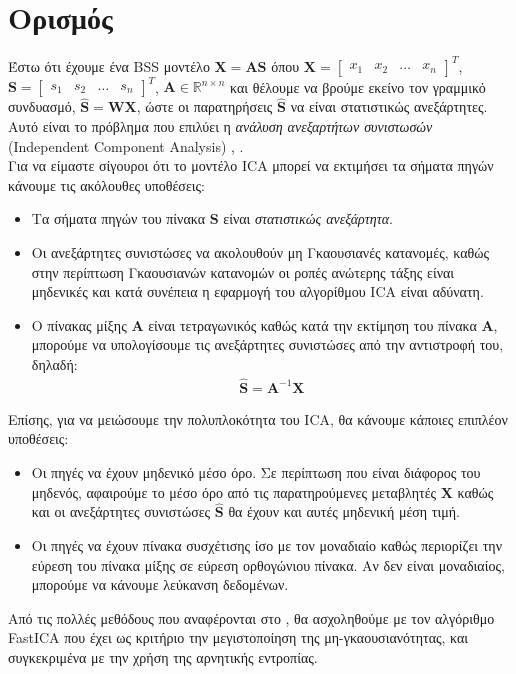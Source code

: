 \gr 
\justifying
\section{Ορισμός} \label{sec:3.1}
Έστω ότι έχουμε ένα \en BSS \gr μοντέλο \en $\mathbf{X} = \mathbf{A} \mathbf{S}$ \gr όπου \en $\mathbf{X} = \begin{bmatrix}x_1 & x_2 & \ldots & x_n \end{bmatrix}^T$, $\mathbf{S} = \begin{bmatrix} s_1 & s_2 & \ldots & s_n \end{bmatrix}^T$, $\mathbf{A} \in \mathbb{R}^{n \times n}$ \gr και θέλουμε να βρούμε εκείνο τον γραμμικό συνδυασμό, \en $\mathbf{\hat{S}} = \mathbf{W} \mathbf{X}$, \gr ώστε οι παρατηρήσεις \en $\mathbf{\hat{S}}$ \gr να είναι στατιστικώς ανεξάρτητες. Αυτό είναι το πρόβλημα που επιλύει η \emph{ανάλυση ανεξαρτήτων συνιστωσών} \en (Independent Component Analysis) \cite{ica:6}, \cite{ica:7}.
\\ 
\gr Για να είμαστε σίγουροι ότι το μοντέλο \en ICA \gr μπορεί να εκτιμήσει τα σήματα πηγών κάνουμε τις ακόλουθες υποθέσεις:
\begin{itemize}
    \item Τα σήματα πηγών του πίνακα \en $\mathbf{S}$ \gr είναι \emph{στατιστικώς ανεξάρτητα}.
    \item Οι ανεξάρτητες συνιστώσες να ακολουθούν μη Γκαουσιανές κατανομές, καθώς στην περίπτωση Γκαουσιανών κατανομών οι ροπές ανώτερης τάξης είναι μηδενικές και κατά συνέπεια η εφαρμογή του αλγορίθμου \en ICA \gr είναι αδύνατη.
    \item Ο πίνακας μίξης \en $\mathbf{A}$ \gr είναι τετραγωνικός καθώς κατά την εκτίμηση του πίνακα \en $\mathbf{A}$, \gr μπορούμε να υπολογίσουμε τις ανεξάρτητες συνιστώσες από την αντιστροφή του, δηλαδή: \en
    \begin{align*}
        \mathbf{\hat{S}} = \mathbf{A}^{-1} \mathbf{X}
    \end{align*}
\end{itemize}
\gr Επίσης, για να μειώσουμε την πολυπλοκότητα του \en ICA, \gr θα κάνουμε κάποιες επιπλέον υποθέσεις:
\begin{itemize}
    \item Οι πηγές να έχουν μηδενικό μέσο όρο. Σε περίπτωση που είναι διάφορος του μηδενός, αφαιρούμε το μέσο όρο από τις παρατηρούμενες μεταβλητές \en $\mathbf{X}$ \gr καθώς και οι ανεξάρτητες συνιστώσες \en $\mathbf{\hat{S}}$ \gr θα έχουν και αυτές μηδενική μέση τιμή.
    \item Οι πηγές να έχουν πίνακα συσχέτισης ίσο με τον μοναδιαίο καθώς περιορίζει την εύρεση του πίνακα μίξης σε εύρεση ορθογώνιου πίνακα. Αν δεν είναι μοναδιαίος, μπορούμε να κάνουμε λεύκανση δεδομένων. 
\end{itemize}
Από τις πολλές μεθόδους που αναφέρονται στο \cite{ica:6}, θα ασχοληθούμε με τον αλγόριθμο \en FastICA \gr που έχει ως κριτήριο την μεγιστοποίηση της μη-γκαουσιανότητας, και συγκεκριμένα με την χρήση της αρνητικής εντροπίας.
